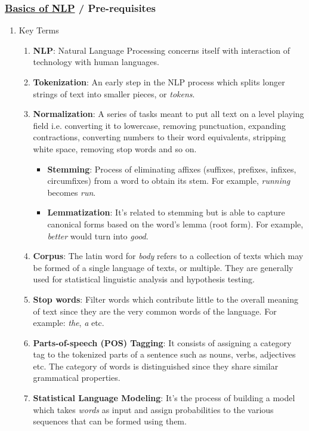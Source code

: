 \documentclass[11pt]{article}
\begin{document}
\subsubsection{\href{https://www.kdnuggets.com/2018/06/getting-started-natural-language-processing.html}{Basics of NLP} / Pre-requisites}
\label{sec:org0e6bb42}
\begin{enumerate}
\item Key Terms
\label{sec:org6318b85}
\begin{enumerate}
\item \textbf{NLP}: Natural Language Processing concerns itself with interaction of technology with human languages.
\item \textbf{Tokenization}: An early step in the NLP process which splits longer strings of text into smaller pieces, or \emph{tokens}.
\item \textbf{Normalization}: A series of tasks meant to put all text on a level playing field i.e. converting it to lowercase, removing punctuation, expanding contractions, converting numbers to their word equivalents, stripping white space, removing stop words and so on.
\begin{itemize}
\item \textbf{Stemming}: Process of eliminating affixes (suffixes, prefixes, infixes, circumfixes) from a word to obtain its stem. For example, \emph{running} becomes \emph{run}.
\item \textbf{Lemmatization}: It's related to stemming but is able to capture canonical forms based on the word's lemma (root form). For example, \emph{better} would turn into \emph{good}.
\end{itemize}
\item \textbf{Corpus}: The latin word for \emph{body} refers to a collection of texts which may be formed of a single language of texts, or multiple. They are generally used for statistical linguistic analysis and hypothesis testing.
\item \textbf{Stop words}: Filter words which contribute little to the overall meaning of text since they are the very common words of the language. For example: \emph{the}, \emph{a} etc.
\item \textbf{Parts-of-speech (POS) Tagging}: It consists of assigning a category tag to the tokenized parts of a sentence such as nouns, verbs, adjectives etc. The category of words is distinguished since they share similar grammatical properties.
\item \textbf{Statistical Language Modeling}: It's the process of building a model which takes \emph{words} as input and assign probabilities to the various sequences that can be formed using them.

\end{enumerate}
\end{enumerate}
\end{document}
